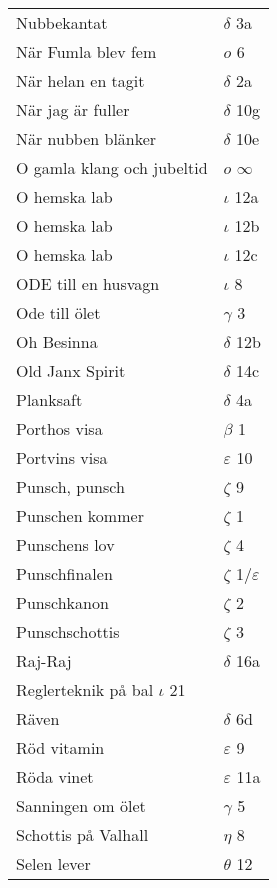 \documentclass[a6paper,10pt]{article}
\begin{document}
\newpage
\setlength{\oddsidemargin}{-0.47in}
\begin{table}[!h]
\begin{tabular}{l l}
Nubbekantat&	$\delta$ 3a\\
När Fumla blev fem&  $o$ 6\\
När helan en tagit	&$\delta$ 2a\\
När jag är fuller&	$\delta$ 10g\\
När nubben blänker&	$\delta$ 10e\\
O gamla klang och jubeltid&	$o$ $\infty$\\
O hemska lab&	$\iota$ 12a\\
O hemska lab&	$\iota$ 12b\\
O hemska lab&	$\iota$ 12c\\
ODE till en husvagn	&$\iota$ 8\\
Ode till ölet&	$\gamma$ 3\\
Oh Besinna&	$\delta$ 12b\\
Old Janx Spirit&	$\delta$ 14c\\
Planksaft	&$\delta$ 4a\\
Porthos visa&	$\beta$ 1\\
Portvins visa	&$\varepsilon$ 10\\
Punsch, punsch	&$\zeta$ 9\\
Punschen kommer&	$\zeta$ 1\\
Punschens lov&	$\zeta$ 4\\
Punschfinalen	&$\zeta$ 1/$\varepsilon$\\
Punschkanon&	$\zeta$ 2\\
Punschschottis	&$\zeta$ 3\\
Raj-Raj&	$\delta$ 16a\\
Reglerteknik på bal $\iota$ 21\\
Räven&	$\delta$ 6d\\
Röd vitamin	&$\varepsilon$ 9\\
Röda vinet&	$\varepsilon$ 11a\\
Sanningen om ölet&	$\gamma$ 5\\
Schottis på Valhall&	$\eta$ 8\\
Selen lever	&$\theta$ 12\\
\end{tabular}
\end{table}
\end{document}
